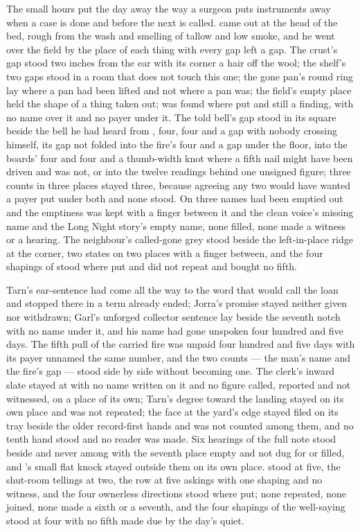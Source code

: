 The small hours put the day away the way a surgeon puts instruments away when a case is done and before the next is called.  came out at the head of the bed, rough from the wash and smelling of tallow and low smoke, and he went over the field by the place of each thing with every gap left a gap. The crust's gap stood two inches from the ear with its corner a hair off the wool; the shelf's two gaps stood in a room that does not touch this one; the gone pan's round ring lay where a pan had been lifted and not where a pan was; the field's empty place held the shape of a thing taken out;  was found where put and still a finding, with no name over it and no payer under it. The told bell's gap stood in its square beside the bell he had heard from , four, four and a gap with nobody crossing himself, its gap not folded into the fire's four and a gap under the floor, into the boards' four and four and a thumb-width knot where a fifth nail might have been driven and was not, or into the twelve readings behind one unsigned figure; three counts in three places stayed three, because agreeing any two would have wanted a payer put under both and none stood. On  three names had been emptied out and the emptiness was kept with a finger between it and the clean voice's missing name and the Long Night story's empty name, none filled, none made a witness or a hearing. The neighbour's called-gone grey stood beside the left-in-place ridge at the corner, two states on two places with a finger between, and the four shapings of  stood where put and did not repeat and bought no fifth.

Tarn's ear-sentence had come all the way to the word that would call the loan and stopped there in a term already ended; Jorra's promise stayed neither given nor withdrawn; Garl's unforged collector sentence lay beside the seventh notch with no name under it, and his name had gone unspoken four hundred and five days. The fifth pull of the carried fire was unpaid four hundred and five days with its payer unnamed the same number, and the two counts --- the man's name and the fire's gap --- stood side by side without becoming one. The clerk's inward slate stayed at  with no name written on it and no figure called, reported and not witnessed, on a place of its own; Tarn's degree toward the landing stayed on its own place and was not repeated; the face at the yard's edge stayed filed on its tray beside the older record-first hands and was not counted among them, and no tenth hand stood and no reader was made. Six hearings of the full note stood beside and never among with the seventh place empty and not dug for or filled, and 's small flat knock stayed outside them on its own place.  stood at five, the shut-room tellings at two, the row at five askings with one shaping and no witness, and the four ownerless directions stood where put; none repeated, none joined, none made a sixth or a seventh, and the four shapings of the well-saying stood at four with no fifth made due by the day's quiet.

